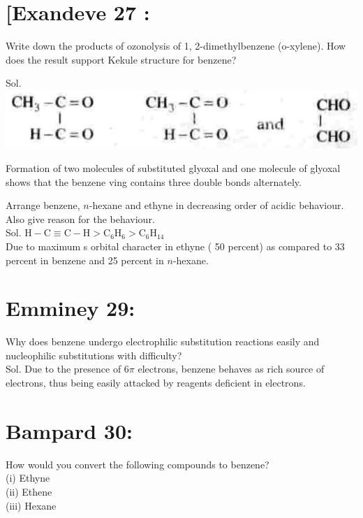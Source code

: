 \documentclass[10pt]{article}
\begin{document}
\section*{[Exandeve 27 :}
Write down the products of ozonolysis of 1, 2-dimethylbenzene (o-xylene). How does the result support Kekule structure for benzene?

Sol.\\
\includegraphics[max width=\textwidth, center]{2025_01_28_8470952b98110cec3aabg-224(1)}

Formation of two molecules of substituted glyoxal and one molecule of glyoxal shows that the benzene ving contains three double bonds alternately.

Arrange benzene, $n$-hexane and ethyne in decreasing order of acidic behaviour. Also give reason for the behaviour.\\
Sol. $\mathrm{H}-\mathrm{C} \equiv \mathrm{C}-\mathrm{H}>\mathrm{C}_{6} \mathrm{H}_{6}>\mathrm{C}_{6} \mathrm{H}_{14}$\\
Due to maximum s orbital character in ethyne ( 50 percent) as compared to 33 percent in benzene and 25 percent in $n$-hexane.

\section*{Emminey 29:}
Why does benzene undergo electrophilic substitution reactions easily and nucleophilic substitutions with difficulty?\\
Sol. Due to the presence of $6 \pi$ electrons, benzene behaves as rich source of electrons, thus being easily attacked by reagents deficient in electrons.

\section*{Bampard 30:}
How would you convert the following compounds to benzene?\\
(i) Ethyne\\
(ii) Ethene\\
(iii) Hexane
\end{document}
